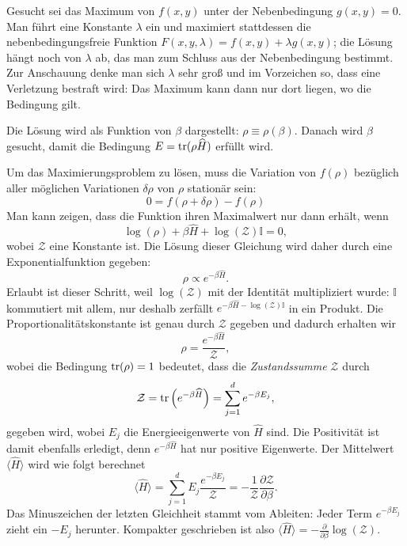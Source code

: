 \begin{greybox}
	Gesucht sei das Maximum von $f(x,y)$ unter der Nebenbedingung $g(x,y)=0$. Man führt eine Konstante $\lambda$ ein und maximiert stattdessen die nebenbedingungsfreie Funktion $F(x,y,\lambda) = f(x,y) + \lambda g(x,y)$; die Lösung hängt noch von $\lambda$ ab, das man zum Schluss aus der Nebenbedingung bestimmt. Zur Anschauung denke man sich $\lambda$ sehr groß und im Vorzeichen so, dass eine Verletzung bestraft wird: Das Maximum kann dann nur dort liegen, wo die Bedingung gilt.
\end{greybox}

Die Lösung wird als Funktion von $\beta$ dargestellt: $\rho \equiv \rho(\beta)$. Danach wird $\beta$ gesucht, damit die Bedingung $E=\operatorname{tr}(\rho \widehat{H})$ erfüllt wird. 

Um das Maximierungsproblem zu lösen, muss die Variation von $f(\rho)$ bezüglich aller möglichen Variationen $\delta \rho$ von $\rho$ stationär sein:
\begin{equation}
	0= f(\rho + \delta\rho) -f(\rho)
\end{equation}
Man kann zeigen, dass die Funktion ihren Maximalwert nur dann erhält, wenn
\begin{equation}
	\log(\rho) + \beta \widehat{H} + \log(\mathcal{Z})\mathbb{I} = 0,
\end{equation}
wobei $\mathcal{Z}$ eine Konstante ist.
Die Lösung dieser Gleichung wird daher durch eine Exponentialfunktion gegeben:
\begin{equation}
	\rho \propto e^{-\beta \widehat{H}}.
\end{equation}
Erlaubt ist dieser Schritt, weil $\log(\mathcal{Z})$ mit der Identität multipliziert wurde: $\mathbb{I}$ kommutiert mit allem, nur deshalb zerfällt $e^{-\beta \widehat{H}-\log(\mathcal{Z})\mathbb{I}}$ in ein Produkt.
Die Proportionalitätskonstante ist genau durch $\mathcal{Z}$ gegeben und dadurch erhalten wir
\begin{equation}
	\rho = \frac{e^{-\beta \widehat{H}}}{\mathcal{Z}},
\end{equation}
wobei die Bedingung $\operatorname{tr}(\rho) = 1$ bedeutet, dass die \emph{Zustandssumme} $\mathcal{Z}$ durch
\begin{equation}
	\mathcal{Z} = \operatorname{tr}\left(e^{-\beta \widehat{H}}\right) = \sum_{j=1}^d e^{-\beta E_j},
\end{equation}
gegeben wird, wobei $E_j$ die Energieeigenwerte von $\widehat{H}$ sind. Die Positivität ist damit ebenfalls erledigt, denn $e^{-\beta \widehat{H}}$ hat nur positive Eigenwerte. Der Mittelwert $\langle \widehat{H}\rangle$ wird wie folgt berechnet
\begin{equation}
	\langle \widehat{H}\rangle = \sum_{j=1}^d E_j \frac{e^{-\beta E_j}}{\mathcal{Z}} = -\frac{1}{\mathcal{Z}}\frac{\partial \mathcal{Z}}{\partial \beta}.
\end{equation}
Das Minuszeichen der letzten Gleichheit stammt vom Ableiten: Jeder Term $e^{-\beta E_j}$ zieht ein $-E_j$ herunter. Kompakter geschrieben ist also $\langle \widehat{H}\rangle = -\frac{\partial}{\partial \beta}\log(\mathcal{Z})$.

